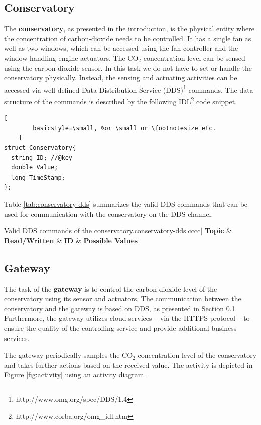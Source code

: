 \documentclass[a4paper, 11pt]{article}
\begin{document}
	\subsection{Conservatory}
	\label{sec:conservatory}
	The \textbf{conservatory}, as presented in the introduction, is the physical entity where the concentration of carbon-dioxide needs to be controlled. It has a single fan as well as two windows, which can be accessed using the fan controller and the window handling engine actuators. The CO$_2$ concentration level can be sensed using the carbon-dioxide sensor. In this task we do not have to set or handle the conservatory physically. Instead, the sensing and actuating activities can be accessed via well-defined Data Distribution Service (DDS)\footnote{http://www.omg.org/spec/DDS/1.4} commands. The data structure of the commands is described by the following IDL\footnote{http://www.corba.org/omg\_idl.htm} code snippet.
	\begin{lstlisting}[
		basicstyle=\small, %or \small or \footnotesize etc.
	]
struct Conservatory{
  string ID; //@key
  double Value;
  long TimeStamp;
};
	\end{lstlisting}
	
	Table \ref{tab:conservatory-dds} summarizes the valid DDS commands that can be used for communication with the conservatory on the DDS channel.
	
	\begin{mytable}{Valid DDS commands of the conservatory.}{conservatory-dds}{|cccc|}
		\hline
		\textbf{Topic} & \textbf{Read/Written} & \textbf{ID} & \textbf{Possible Values} \\ \hline \hline
	\end{mytable}
	
	\subsection{Gateway}
	
	The task of the \textbf{gateway} is to control the carbon-dioxide level of the conservatory using its sensor and actuators. The communication between the conservatory and the gateway is based on DDS, as presented in Section \ref{sec:conservatory}. Furthermore, the gateway utilizes cloud services -- via the HTTPS protocol -- to ensure the quality of the controlling service and provide additional business services.
	
	The gateway periodically samples the CO$_2$ concentration level of the conservatory and takes further actions based on the received value. The activity is depicted in Figure \ref{fig:activity} using an activity diagram.
		
\end{document}
